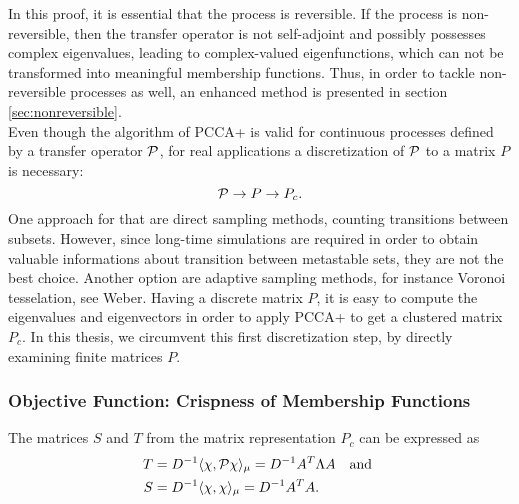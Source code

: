 In this proof, it is essential that the process is reversible. If the process is non-reversible, then the transfer operator is not self-adjoint and possibly possesses complex eigenvalues, leading to complex-valued eigenfunctions, which can not be transformed into meaningful membership functions. %
Thus, in order to tackle non-reversible processes as well, an enhanced method is presented in section \ref{sec:nonreversible}.
\\


Even though the algorithm of PCCA+ is valid for continuous processes defined by a transfer operator $\mathcal{P}$, for real applications a discretization of $\mathcal{P}$ to a matrix $P$ is necessary:
\begin{equation*}
	\mathcal{P} \rightarrow P \rightarrow P_c.
\end{equation*}
One approach for that are direct sampling methods, counting transitions between subsets. However, since long-time simulations are required in order to obtain valuable informations about transition between metastable sets, they are not the best choice. Another option are adaptive sampling methods, for instance Voronoi tesselation, see Weber\cite{weber2011subspace}. 
Having a discrete matrix $P$, it is easy to compute the eigenvalues and eigenvectors in order to apply PCCA+ to get a clustered matrix $P_c$.
In this thesis, we circumvent this first discretization step, by directly examining finite matrices $P$. %


\subsubsection*{Objective Function: Crispness of Membership Functions}

The matrices $S$ and $T$ from the matrix representation $P_c$ can be expressed as
\begin{equation}
\label{eq:projection_presentation2}
\begin{aligned}
T & = D^{-1} \langle \chi, \mathcal{P} \chi \rangle_\mu = D^{-1}A^T \Lambda A \ \ \textrm{ and } \\
S & = D^{-1} \langle \chi, \chi \rangle_\mu = D^{-1} A^T A.
\end{aligned}
\end{equation}


